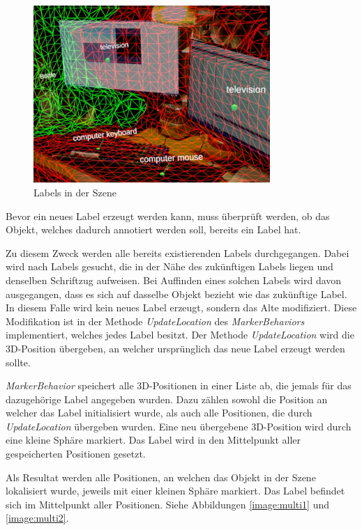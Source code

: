 \begin{figure}[H]
	\centering
	\includegraphics[width=0.8\textwidth]{images/ML_20201004_19.10.05_2.jpg}
	\caption[Labels in der Szene]{Labels in der Szene}
	\label{image:labels}
\end{figure}

Bevor ein neues Label erzeugt werden kann, muss überprüft werden, ob das Objekt, welches dadurch annotiert werden soll, bereits ein Label hat.

Zu diesem Zweck werden alle bereits existierenden Labels durchgegangen. Dabei wird nach Labels gesucht, die in der Nähe des zukünftigen Labels liegen und denselben Schriftzug aufweisen. Bei Auffinden eines solchen Labels wird davon ausgegangen, dass es sich auf dasselbe Objekt bezieht wie das zukünftige Label. In diesem Falle wird kein neues Label erzeugt, sondern das Alte modifiziert. Diese Modifikation ist in der Methode \textit{UpdateLocation} des \textit{MarkerBehaviors} implementiert, welches jedes Label besitzt. Der Methode \textit{UpdateLocation} wird die 3D-Position übergeben, an welcher ursprünglich das neue Label erzeugt werden sollte.

\textit{MarkerBehavior} speichert alle 3D-Positionen in einer Liste ab, die jemals für das dazugehörige Label angegeben wurden. Dazu zählen sowohl die Position an welcher das Label initialisiert wurde, als auch alle Positionen, die durch \textit{UpdateLocation} übergeben wurden. Eine neu übergebene 3D-Position wird durch eine kleine Sphäre markiert. Das Label wird in den Mittelpunkt aller gespeicherten Positionen gesetzt.

Als Resultat werden alle Positionen, an welchen das Objekt in der Szene lokalisiert wurde, jeweils mit einer kleinen Sphäre markiert. Das Label befindet sich im Mittelpunkt aller Positionen. Siehe Abbildungen \ref{image:multi1} und \ref{image:multi2}.

